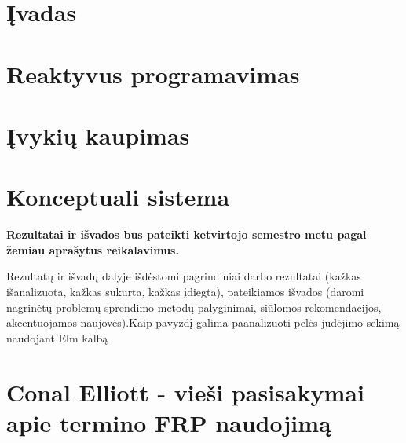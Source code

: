 \documentclass{VUMIFPSmagistrinis}
\begin{document}

\tableofcontents

\section{Įvadas}


\section{Reaktyvus programavimas}


\section{Įvykių kaupimas}


\section{Konceptuali sistema}



\textbf{Rezultatai ir išvados bus pateikti ketvirtojo semestro metu pagal žemiau aprašytus reikalavimus.}

Rezultatų ir išvadų dalyje išdėstomi pagrindiniai darbo rezultatai (kažkas
išanalizuota, kažkas sukurta, kažkas įdiegta), pateikiamos išvados (daromi
nagrinėtų problemų sprendimo metodų palyginimai, siūlomos rekomendacijos,
akcentuojamos naujovės).Kaip pavyzdį galima paanalizuoti pelės judėjimo sekimą naudojant Elm kalbą

\printbibliography[heading=bibintoc]  %





\appendix  %

\section{Conal Elliott - vieši pasisakymai apie termino FRP naudojimą}
\end{document}
